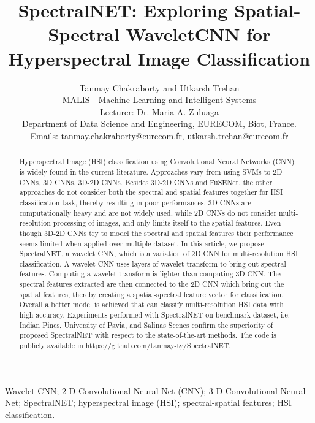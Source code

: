 \documentclass[journal]{IEEEtran}
\begin{document}
\title{SpectralNET: Exploring Spatial-Spectral WaveletCNN for Hyperspectral Image Classification}

\author{Tanmay Chakraborty and Utkarsh Trehan\\
MALIS - Machine Learning and Intelligent Systems\\
Lecturer: Dr. Maria A. Zuluaga\\
Department of Data Science and Engineering, EURECOM, Biot, France.\\
Emails: tanmay.chakraborty@eurecom.fr, utkarsh.trehan@eurecom.fr
}

\maketitle

\begin{abstract}
 Hyperspectral Image (HSI) classification using Convolutional Neural Networks (CNN) is widely found in the current literature. Approaches vary from using SVMs to 2D CNNs, 3D CNNs, 3D-2D CNNs. Besides 3D-2D CNNs and FuSENet, the other approaches do not consider both the spectral and spatial features together for HSI classification task, thereby resulting in poor performances. 3D CNNs are computationally heavy and are not widely used, while 2D CNNs do not consider multi-resolution processing of images, and only limits itself to the spatial features. Even though 3D-2D CNNs try to model the spectral and spatial features their performance seems limited when applied over multiple dataset. In this article, we propose SpectralNET, a wavelet CNN, which is a variation of 2D CNN for multi-resolution HSI classification. A wavelet CNN uses layers of wavelet transform to bring out spectral features. Computing a wavelet transform is lighter than computing 3D CNN. The spectral features extracted are then connected to the 2D CNN which bring out the spatial features, thereby creating a spatial-spectral feature vector for classification. Overall a better model is achieved that can classify multi-resolution HSI data with high accuracy. Experiments performed with SpectralNET on benchmark dataset, i.e. Indian Pines, University of Pavia, and Salinas Scenes confirm the superiority of proposed SpectralNET with respect to the state-of-the-art methods. The code is publicly available in https://github.com/tanmay-ty/SpectralNET.

\end{abstract}


\begin{IEEEkeywords}
Wavelet CNN; 2-D Convolutional Neural Net (CNN); 3-D Convolutional Neural Net; SpectralNET; hyperspectral image (HSI); spectral-spatial features; HSI classification.
\end{IEEEkeywords}
\end{document}
